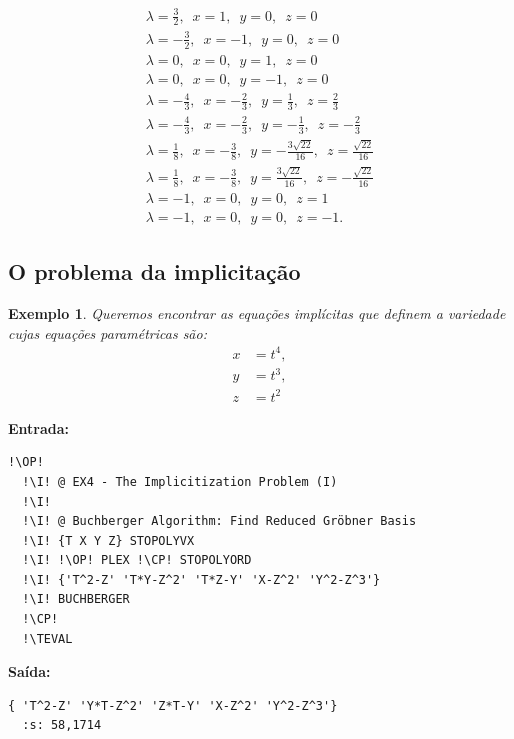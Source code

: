 \documentclass[12pt,a4paper]{report}
\newcommand{\kwd}[1]{\texttt{\textcolor{keyword}{#1}}}
\newcommand{\I}{\enspace\textcolor{indent}\vrule\hspace{2pt}}
\newcommand{\TEVAL}{\kwd{TEVAL}}   %
\newcommand{\OP}{\kwd{$\ll$}}   %
\newcommand{\CP}{\kwd{$\gg$}}   %
\newtheorem{example}[theorem]{Exemplo}
\numberwithin{theorem}{chapter}
\begin{document}
\begin{align*}
  \lambda=\frac{3}{2},\enspace x=1,\enspace y=0,\enspace z=0\\
  \lambda=-\frac{3}{2},\enspace x=-1,\enspace y=0,\enspace z=0\\
  \lambda=0,\enspace x=0,\enspace y=1,\enspace z=0\\
  \lambda=0,\enspace x=0,\enspace y=-1,\enspace z=0\\
  \lambda=-\frac{4}{3},\enspace x=-\frac{2}{3},\enspace y=\frac{1}{3},\enspace z=\frac{2}{3}\\
  \lambda=-\frac{4}{3},\enspace x=-\frac{2}{3},\enspace y=-\frac{1}{3},\enspace z=-\frac{2}{3}\\
  \lambda=\frac{1}{8},\enspace x=-\frac{3}{8},\enspace y=-\frac{3\sqrt{22}}{16},\enspace z=\frac{\sqrt{22}}{16}\\
  \lambda=\frac{1}{8},\enspace x=-\frac{3}{8},\enspace y=\frac{3\sqrt{22}}{16},\enspace z=-\frac{\sqrt{22}}{16}\\
  \lambda=-1,\enspace x=0,\enspace y=0,\enspace z=1\\
  \lambda=-1,\enspace x=0,\enspace y=0,\enspace z=-1.
\end{align*}


\subsection{O problema da implicitação}

\begin{example}
  Queremos encontrar as equações implícitas que definem a variedade
  cujas equações paramétricas são:
  \begin{align*}
    x &= t^4,\\
    y &= t^3,\\
    z &= t^2
  \end{align*}
\end{example}

\noindent\textbf{Entrada:}

\begin{lstlisting}[language=userrpl]
  !\OP!
  !\I! @ EX4 - The Implicitization Problem (I)
  !\I!
  !\I! @ Buchberger Algorithm: Find Reduced Gröbner Basis
  !\I! {T X Y Z} STOPOLYVX
  !\I! !\OP! PLEX !\CP! STOPOLYORD
  !\I! {'T^2-Z' 'T*Y-Z^2' 'T*Z-Y' 'X-Z^2' 'Y^2-Z^3'}
  !\I! BUCHBERGER
  !\CP!
  !\TEVAL
\end{lstlisting}

\noindent\textbf{Saída:}

\begin{lstlisting}[language=userrpl]
  { 'T^2-Z' 'Y*T-Z^2' 'Z*T-Y' 'X-Z^2' 'Y^2-Z^3'}
  :s: 58,1714
\end{lstlisting}
\end{document}
